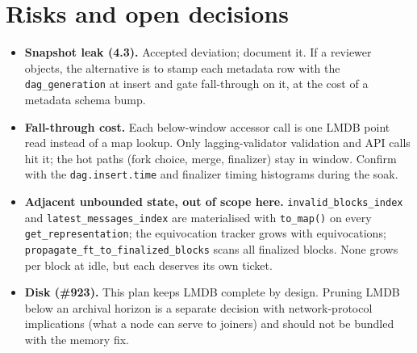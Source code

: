 \documentclass[11pt]{article}
\newcommand{\code}[1]{\texttt{#1}}
\begin{document}
\section{Risks and open decisions}

\begin{itemize}
\item \textbf{Snapshot leak (4.3).} Accepted deviation; document it. If a
  reviewer objects, the alternative is to stamp each metadata row with the
  \code{dag\_generation} at insert and gate fall-through on it, at the cost
  of a metadata schema bump.
\item \textbf{Fall-through cost.} Each below-window accessor call is one LMDB
  point read instead of a map lookup. Only lagging-validator validation and
  API calls hit it; the hot paths (fork choice, merge, finalizer) stay in
  window. Confirm with the \code{dag.insert.time} and finalizer timing
  histograms during the soak.
\item \textbf{Adjacent unbounded state, out of scope here.}
  \code{invalid\_blocks\_index} and \code{latest\_messages\_index} are
  materialised with \code{to\_map()} on every \code{get\_representation};
  the equivocation tracker grows with equivocations;
  \code{propagate\_ft\_to\_finalized\_blocks} scans all finalized blocks.
  None grows per block at idle, but each deserves its own ticket.
\item \textbf{Disk (\#923).} This plan keeps LMDB complete by design. Pruning
  LMDB below an archival horizon is a separate decision with
  network-protocol implications (what a node can serve to joiners) and should
  not be bundled with the memory fix.
\end{itemize}
\end{document}
